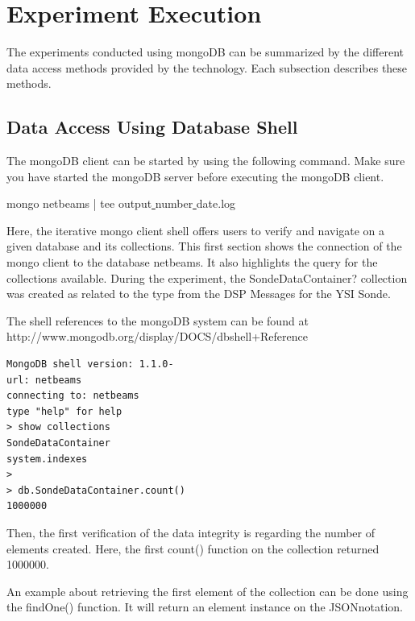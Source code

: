 \section{Experiment Execution}

The experiments conducted using mongoDB can be summarized by the different
data access methods provided by the technology. Each subsection describes these
methods.

\subsection{Data Access Using Database Shell}

The mongoDB client can be started by using the following command. Make sure you
have started the mongoDB server before executing the mongoDB client.

mongo netbeams | tee output\underline{ }number\underline{ }date.log

Here, the iterative mongo client shell offers users to verify and navigate on a
given database and its collections. This first section shows the connection of
the mongo client to the database netbeams. It also highlights the query for the
collections available. During the experiment, the SondeDataContainer?
collection was created as related to the type from the DSP Messages for the YSI
Sonde.

The shell references to the mongoDB system can be found at
http://www.mongodb.org/display/DOCS/dbshell+Reference 

\lstset{label=cmd:mongo,caption=Execution of mongo client}
\begin{lstlisting}
MongoDB shell version: 1.1.0-
url: netbeams
connecting to: netbeams
type "help" for help
> show collections
SondeDataContainer
system.indexes
>
> db.SondeDataContainer.count()
1000000
\end{lstlisting}

Then, the first verification of the data integrity is regarding the number of
elements created. Here, the first count() function on the collection returned
1000000.

An example about retrieving the first element of the collection can be done
using the findOne() function. It will return an element instance on the
JSONnotation.

